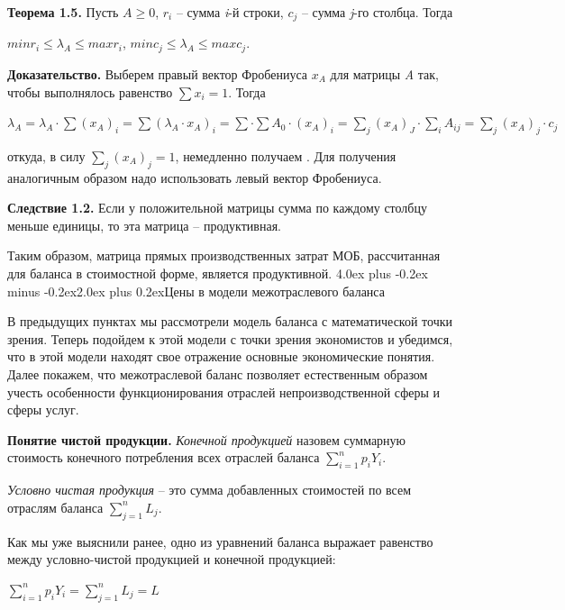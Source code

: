 \documentclass[12pt, 4paper]{book}
\makeatletter
\renewcommand{\section}{\@startsection{section}{1}{1pt}%
	{4.0ex plus -0.2ex minus -0.2ex}{2.0ex plus 0.2ex}{\centering\bf}}%
\makeatother
\begin{document}
{\textbf{Теорема 1.5.} Пусть $ A \geq 0 $, $ r_i $ – сумма \textit{i}-й строки, $ c_j $ – сумма \textit{j}-го столбца. Тогда
\begin{center}
	$ min r_i \leq \lambda_A \leq max r_i $,
	$ min c_j \leq \lambda_A \leq max c_j $.
\end{center}
\par
	
\textbf{Доказательство.} Выберем правый вектор Фробениуса {$ x_A $} для матрицы \textit{A} так, чтобы выполнялось равенство $ \sum x_i = 1 $. Тогда
\begin{center}
	$ \lambda_A = \lambda_A \cdot \sum(x_A)_i = \sum(\lambda_A \cdot x_A)_i = \sum \cdot \sum A_0 \cdot (x_A)_i = \sum\limits_{j} (x_A) _J \cdot \sum\limits_{i} A_{ij} = \sum\limits_{j} (x_A)_j \cdot c_j $
\end{center}
откуда, в силу $ \sum\limits_{j} (x_A)_j = 1 $, немедленно получаем . Для получения  аналогичным образом надо использовать левый вектор Фробениуса.
\par

\textbf{Следствие 1.2.} Если у положительной матрицы сумма по каждому столбцу меньше единицы, то эта матрица – продуктивная.
\par

Таким образом, матрица прямых производственных затрат МОБ, рассчитанная для баланса в стоимостной форме, является продуктивной.
\section{Цены в модели межотраслевого баланса}
\par

В предыдущих пунктах мы рассмотрели модель баланса с математической точки зрения. Теперь подойдем к этой модели с точки зрения экономистов и убедимся, что в этой модели находят свое отражение основные экономические понятия. Далее покажем, что межотраслевой баланс позволяет естественным образом учесть особенности функционирования отраслей непроизводственной сферы и сферы услуг.
\par

\textbf{Понятие чистой продукции.} \textit{Конечной продукцией} назовем суммарную стоимость конечного потребления всех отраслей баланса $ \sum\limits_{i=1}^n p_i Y_i $.
\par

\textit{Условно чистая продукция} – это сумма добавленных стоимостей по всем отраслям баланса $ \sum_{j=1}^n L_j $.
\par
Как мы уже выяснили ранее, одно из уравнений баланса выражает равенство между условно-чистой продукцией и конечной продукцией:
\begin{center}
$ \sum\limits_{i=1}^n p_i Y_i = \sum\limits_{j=1}^n L_j = L $
\end{center}
\par

}
\end{document}
